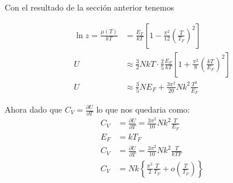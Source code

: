 \documentclass{report}
\begin{document}
Con el resultado de la sección anterior tenemos

\begin{align*}
  \ln z = \frac{\mu(T)}{kT} &= \frac{E_F}{kT} \left[ 1 - \frac{\pi^2}{12} \left( \frac{T}{T_F} \right)^2 \right]\\
  U &\approx \frac{3}{2} NkT \cdot \frac{2}{5} \frac{E_F}{kT} \left[ 1 + \frac{\pi^2}{8} \left( \frac{kT}{E_F} \right)^2 \right]\\
  U &\approx \frac{3}{5} N E_F + \frac{3\pi^2}{20} Nk^2 \frac{T^2}{E_F}
\end{align*}

Ahora dado que $C_V = \frac{\partial U}{\partial T}$ lo que nos quedaria como:
\begin{align*}
  C_V &= \frac{\partial U}{\partial T} = \frac{3\pi^2}{10} Nk^2 \frac{T}{E_F}\\
  E_F &= kT_F\\
  C_V &= \frac{\partial U}{\partial T} = \frac{3\pi^2}{10} Nk^2 \frac{T}{kTF}\\
  C_V &= Nk \left\{\frac{\pi^2}{2} \frac{T}{T_F} + o\left( \frac{T}{T_F} \right)\right\}
\end{align*}


\section{}

\chapter{}

\section{}

\section{}

\section{}

\section{}

\end{document}
